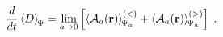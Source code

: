 \begin{equation}
\frac{d}{dt}
\left\langle
D
\right\rangle_{\scriptstyle \!  \Psi}
=
\lim_{a \rightarrow 0}
\left[
\left\langle
{\mathcal A}_{a} ({\bf r})
\right\rangle_{\scriptstyle \!  \Psi_{a}}^{(<)}
+
\left\langle
{\mathcal A}_{a} ({\bf r})
\right\rangle_{\scriptstyle \!  \Psi_{a}}^{(>)}
\right]
\;  .
\label{eq:time_rate_of_dilation_op_ddim-EV_2D_ISP_reg}
\end{equation}

